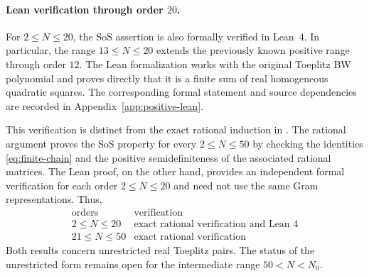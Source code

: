 \paragraph{Lean verification through order $20$.} For $2\le N\le20$, the SoS assertion is also formally verified in
Lean~4.  In particular, the range $13\le N\le20$ extends the previously
known positive range through order $12$.  The Lean formalization works
with the original Toeplitz BW polynomial and proves directly that it is
a finite sum of real homogeneous quadratic squares.  The corresponding
formal statement and source dependencies are recorded in
Appendix~\ref{app:positive-lean}.

This verification is distinct from the exact rational induction in
.  The rational argument proves the SoS
property for every $2\le N\le50$ by checking the identities
\eqref{eq:finite-chain} and the positive semidefiniteness of the
associated rational matrices.  The Lean proof, on the other hand,
provides an independent formal verification for each order
$2\le N\le20$ and need not use the same Gram representations. 
Thus,
\[
 \begin{array}{c|c}
 \text{orders}&\text{verification}\\\hline
 2\le N\le20&\text{exact rational verification and Lean~4}\\
 21\le N\le50&\text{exact rational verification}
 \end{array}
\]
Both results concern unrestricted real Toeplitz pairs.  The status of
the unrestricted form remains open for the intermediate range
$
50<N<N_0.
$